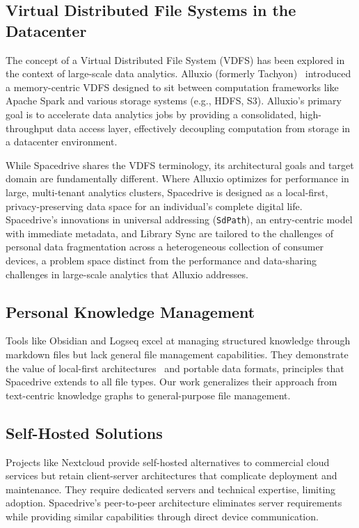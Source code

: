 \documentclass[sigconf]{acmart}
\begin{document}
\subsection{Virtual Distributed File Systems in the Datacenter}
The concept of a Virtual Distributed File System (VDFS) has been explored in the context of large-scale data analytics. Alluxio (formerly Tachyon)~\cite{alluxio_vdfs} introduced a memory-centric VDFS designed to sit between computation frameworks like Apache Spark and various storage systems (e.g., HDFS, S3). Alluxio's primary goal is to accelerate data analytics jobs by providing a consolidated, high-throughput data access layer, effectively decoupling computation from storage in a datacenter environment.

While Spacedrive shares the VDFS terminology, its architectural goals and target domain are fundamentally different. Where Alluxio optimizes for performance in large, multi-tenant analytics clusters, Spacedrive is designed as a local-first, privacy-preserving data space for an individual's complete digital life. Spacedrive's innovations in universal addressing (\texttt{SdPath}), an entry-centric model with immediate metadata, and Library Sync are tailored to the challenges of personal data fragmentation across a heterogeneous collection of consumer devices, a problem space distinct from the performance and data-sharing challenges in large-scale analytics that Alluxio addresses.

\subsection{Personal Knowledge Management}
Tools like Obsidian and Logseq excel at managing structured knowledge through markdown files but lack general file management capabilities. They demonstrate the value of local-first architectures~\cite{kleppmann_localfirst_2019} and portable data formats, principles that Spacedrive extends to all file types. Our work generalizes their approach from text-centric knowledge graphs to general-purpose file management.

\subsection{Self-Hosted Solutions}
Projects like Nextcloud provide self-hosted alternatives to commercial cloud services but retain client-server architectures that complicate deployment and maintenance. They require dedicated servers and technical expertise, limiting adoption. Spacedrive's peer-to-peer architecture eliminates server requirements while providing similar capabilities through direct device communication.
\end{document}
